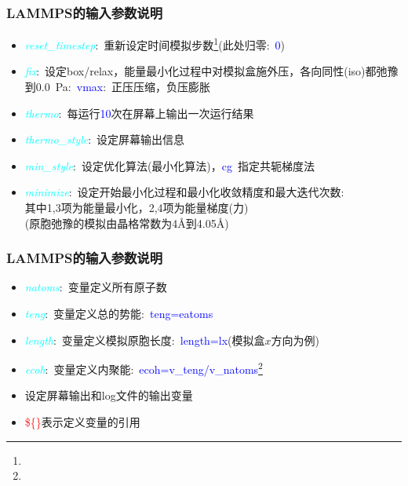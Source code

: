 \frame
{
	\frametitle{\textrm{LAMMPS}的输入参数说明}
{\fontsize{7.5pt}{6.0pt}\selectfont{
}
\begin{itemize}
	\item \textcolor{cyan}{\textit{reset\_timestep}}:~重新设定时间模拟步数\footnote{\fontsize{6.2pt}{5.2pt}}(此处归零:~\textcolor{blue}{\textrm{0}})
	\item \textcolor{cyan}{\textit{fix}}:~设定\textrm{box/relax}，能量最小化过程中对模拟盒施外压，各向同性\textrm{(iso)}都弛豫到\textrm{0.0~Pa}:~\textcolor{blue}{\textrm{vmax}}:~正压压缩，负压膨胀
	\item \textcolor{cyan}{\textit{thermo}}:~每运行\textcolor{blue}{10}次在屏幕上输出一次运行结果
	\item \textcolor{cyan}{\textit{thermo\_style}}:~设定屏幕输出信息
	\item \textcolor{cyan}{\textit{min\_style}}:~设定优化算法(最小化算法)，\textcolor{blue}{\textrm{cg}}~指定共轭梯度法
	\item \textcolor{cyan}{\textit{minimize}}:~设定开始最小化过程和最小化收敛精度和最大迭代次数:\\
		其中1,3项为能量最小化，2,4项为能量梯度(力)\\
		(原胞弛豫的模拟由晶格常数为\textrm{4\AA}到\textrm{4.05\AA})
\end{itemize}
}
}

\frame
{
	\frametitle{\textrm{LAMMPS}的输入参数说明}
	{\fontsize{7.5pt}{6.0pt}\selectfont{
}
\begin{itemize}
	\item \textcolor{cyan}{\textit{natoms}}:~变量定义所有原子数
	\item \textcolor{cyan}{\textit{teng}}:~变量定义总的势能:~\textcolor{blue}{\textrm{teng=eatoms}}
	\item \textcolor{cyan}{\textit{length}}:~变量定义模拟原胞长度:~\textcolor{blue}{\textrm{length=lx}}(模拟盒$x$方向为例)
	\item \textcolor{cyan}{\textit{ecoh}}:~变量定义内聚能:~\textcolor{blue}{\textrm{ecoh=v\_teng/v\_natoms}}\footnote{\fontsize{6.2pt}{5.2pt}}
\end{itemize}}
{\fontsize{7.5pt}{6.0pt}\selectfont{
}
\begin{itemize}
	\item 设定屏幕输出和\textrm{log}文件的输出变量
	\item \textcolor{red}{\$\{\}}表示定义变量的引用
\end{itemize}
}
}

